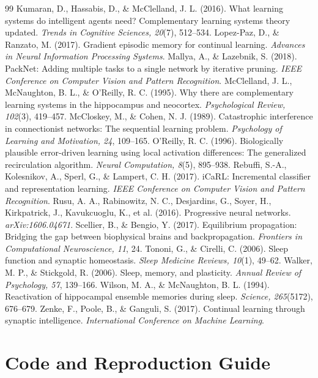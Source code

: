 \documentclass[11pt]{article}
\begin{document}
\begin{thebibliography}{99}
 Kumaran, D., Hassabis, D., \& McClelland, J. L. (2016). What learning systems do intelligent agents need? Complementary learning systems theory updated. \textit{Trends in Cognitive Sciences, 20}(7), 512--534.
 Lopez-Paz, D., \& Ranzato, M. (2017). Gradient episodic memory for continual learning. \textit{Advances in Neural Information Processing Systems}.
 Mallya, A., \& Lazebnik, S. (2018). PackNet: Adding multiple tasks to a single network by iterative pruning. \textit{IEEE Conference on Computer Vision and Pattern Recognition}.
 McClelland, J. L., McNaughton, B. L., \& O'Reilly, R. C. (1995). Why there are complementary learning systems in the hippocampus and neocortex. \textit{Psychological Review, 102}(3), 419--457.
 McCloskey, M., \& Cohen, N. J. (1989). Catastrophic interference in connectionist networks: The sequential learning problem. \textit{Psychology of Learning and Motivation, 24}, 109--165.
 O'Reilly, R. C. (1996). Biologically plausible error-driven learning using local activation differences: The generalized recirculation algorithm. \textit{Neural Computation, 8}(5), 895--938.
 Rebuffi, S.-A., Kolesnikov, A., Sperl, G., \& Lampert, C. H. (2017). iCaRL: Incremental classifier and representation learning. \textit{IEEE Conference on Computer Vision and Pattern Recognition}.
 Rusu, A. A., Rabinowitz, N. C., Desjardins, G., Soyer, H., Kirkpatrick, J., Kavukcuoglu, K., et al. (2016). Progressive neural networks. \textit{arXiv:1606.04671}.
 Scellier, B., \& Bengio, Y. (2017). Equilibrium propagation: Bridging the gap between biophysical brains and backpropagation. \textit{Frontiers in Computational Neuroscience, 11}, 24.
 Tononi, G., \& Cirelli, C. (2006). Sleep function and synaptic homeostasis. \textit{Sleep Medicine Reviews, 10}(1), 49--62.
 Walker, M. P., \& Stickgold, R. (2006). Sleep, memory, and plasticity. \textit{Annual Review of Psychology, 57}, 139--166.
 Wilson, M. A., \& McNaughton, B. L. (1994). Reactivation of hippocampal ensemble memories during sleep. \textit{Science, 265}(5172), 676--679.
 Zenke, F., Poole, B., \& Ganguli, S. (2017). Continual learning through synaptic intelligence. \textit{International Conference on Machine Learning}.
\end{thebibliography}

\appendix
\section{Code and Reproduction Guide}
\label{app:reproduction}
\end{document}
